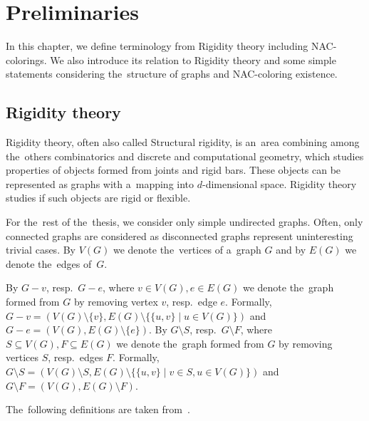 
\chapter{Preliminaries}%
\label{chapter:preliminaries}

\begin{chapterabstract}

	In this chapter, we define terminology from Rigidity theory including NAC-colorings.
	We also introduce its relation to Rigidity theory and
	some simple statements considering
	the~structure of graphs and NAC-coloring existence.

\end{chapterabstract}

\section{Rigidity theory}

Rigidity theory, often also called Structural rigidity,
is an~area combining among the~others
combinatorics and discrete and computational geometry,
which studies properties of objects formed from joints and rigid bars.
These objects can be represented as graphs with
a~mapping into \( d \)-dimensional space.
Rigidity theory studies if such objects are rigid or flexible.

For the~rest of the~thesis,
we consider only simple undirected graphs.
Often, only connected graphs are considered as disconnected graphs
represent uninteresting trivial cases.
By \( V(G) \) we denote the~vertices of a~graph \( G \) and
by \( E(G) \) we denote the~edges of~\( G \).

By \( G - v \), resp.\ \( G - e \),
where \( v \in V(G), e \in E(G) \) we denote the~graph
formed from \( G \) by removing vertex \( v \), resp.\ edge \( e \).
Formally,
\( G - v = (V(G) \setminus \{v\}, E(G) \setminus \{\{u, v\} \mid u \in V(G)\}) \)
and \( G - e = (V(G), E(G) \setminus \{e\}) \).
%
By \( G \setminus S \), resp.\ \( G \setminus F \),
where \( S \subseteq V(G), F \subseteq E(G) \) we denote the~graph
formed from \( G \) by removing vertices \( S \), resp.\ edges \( F \).
Formally,
\( G \setminus S = (V(G) \setminus S, E(G) \setminus \{\{u, v\} \mid v \in S, u \in V(G)\}) \)
and \( G \setminus F = (V(G), E(G) \setminus F) \).

The~following definitions are taken from~\cite{np_complete,my_paper}.

